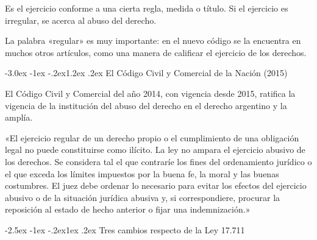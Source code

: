 \documentclass[12pt,oneside]{book}
\makeatletter
\renewcommand\section{\@startsection{section}{1}{\z@}%
  {-3.0ex \@plus -1ex \@minus -.2ex}{1.2ex \@plus .2ex}%
  {\normalfont\large\bfseries\color{acento}}}
\renewcommand\subsection{\@startsection{subsection}{2}{\z@}%
  {-2.5ex \@plus -1ex \@minus -.2ex}{1ex \@plus .2ex}%
  {\normalfont\normalsize\bfseries}}
\makeatother
\begin{document}
\begin{definicion}
Es el ejercicio conforme a una cierta regla, medida o título. Si el ejercicio es irregular, se acerca al abuso del derecho.
\end{definicion}

La palabra «regular» es muy importante: en el nuevo código se la encuentra en muchos otros artículos, como una manera de calificar el ejercicio de los derechos.

\section{El Código Civil y Comercial de la Nación (2015)}

El Código Civil y Comercial del año 2014, con vigencia desde 2015, ratifica la vigencia de la institución del abuso del derecho en el derecho argentino y la amplía.

\begin{regla}
«El ejercicio regular de un derecho propio o el cumplimiento de una obligación legal no puede constituirse como ilícito. La ley no ampara el ejercicio abusivo de los derechos. Se considera tal el que contraríe los fines del ordenamiento jurídico o el que exceda los límites impuestos por la buena fe, la moral y las buenas costumbres. El juez debe ordenar lo necesario para evitar los efectos del ejercicio abusivo o de la situación jurídica abusiva y, si correspondiere, procurar la reposición al estado de hecho anterior o fijar una indemnización.»
\end{regla}

\subsection{Tres cambios respecto de la Ley 17.711}
\end{document}
